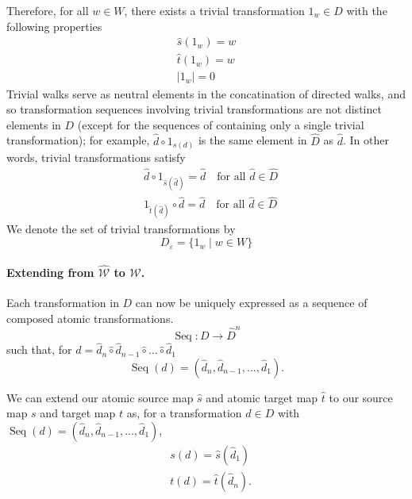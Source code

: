 Therefore, for all $w \in W$, there exists a trivial transformation $1_{w} \in D$ with the following properties
\begin{align}
	\hat{s}(1_{w}) = w \\
	\hat{t}(1_{w}) = w \\
	|1_{w}| = 0
\end{align}
Trivial walks serve as neutral elements in the concatination of directed walks, and so transformation sequences involving trivial transformations are not distinct elements in $D$ (except for the sequences of containing only a single trivial transformation); for example, $\hat{d} \circ 1_{s(d)}$ is the same element in $\hat{D}$ as $\hat{d}$.
In other words, trivial transformations satisfy
\begin{align}
	& \hat{d} \circ 1_{\hat{s}(\hat{d})} = \hat{d} \quad \text{for all $\hat{d} \in \hat{D}$} \\
	& 1_{\hat{t}(\hat{d})} \circ \hat{d} = \hat{d} \quad \text{for all $\hat{d} \in \hat{D}$}
\end{align}
We denote the set of trivial transformations by
\begin{equation}
	D_{\varepsilon} = \{ 1_{w} \mid w \in W \}
\end{equation}

\paragraph{Extending from $\hat{\mathscr{W}}$ to $\mathscr{W}$.}
Each transformation in $D$ can now be uniquely expressed as a sequence of composed atomic transformations.
\begin{equation}
	\operatorname{Seq}: D \to \hat{D}^{n}
\end{equation}
such that, for $d = \hat{d}_{n} \hat{\circ} \hat{d}_{n-1} \hat{\circ} \dots \hat{\circ} \hat{d}_{1}$
\begin{equation}
	\operatorname{Seq}(d) = (\hat{d}_{n}, \hat{d}_{n-1}, \dots, \hat{d}_{1}).
\end{equation}

We can extend our atomic source map $\hat{s}$ and atomic target map $\hat{t}$ to our source map $s$ and target map $t$ as, for a transformation $d \in D$ with $\operatorname{Seq}(d) = (\hat{d}_{n}, \hat{d}_{n-1}, \dots, \hat{d}_{1})$,
\begin{align}
	& s(d) = \hat{s}(\hat{d}_{1}) \\
	& t(d) = \hat{t}(\hat{d}_{n}).
\end{align}

